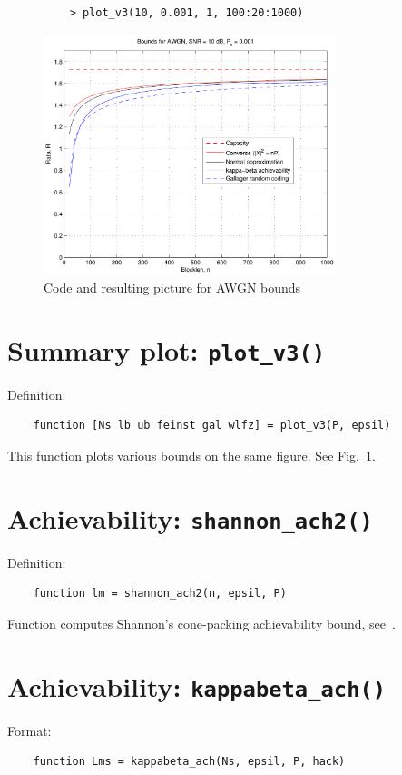 \documentclass[a4paper,11p]{memoir}
\begin{document}
\begin{figure}
\centering
\begin{verbatim}
	> plot_v3(10, 0.001, 1, 100:20:1000)
\end{verbatim}
\includegraphics[height=7cm]{plots/awgn_plot3_ex}
\caption{Code and resulting picture for AWGN bounds}\label{fig:awgn_example}
\end{figure}


\section{Summary plot: \texttt{plot\_v3()}}

Definition:
\begin{verbatim}
	function [Ns lb ub feinst gal wlfz] = plot_v3(P, epsil)
\end{verbatim}

This function plots various bounds on the same figure. See Fig.~\ref{fig:awgn_example}.


\section{Achievability: \texttt{shannon\_ach2()}}

Definition:
\begin{verbatim}
	function lm = shannon_ach2(n, epsil, P)
\end{verbatim}

Function computes Shannon's cone-packing achievability bound, see~\cite[(41)]{PPV08}.

\section{Achievability: \texttt{kappabeta\_ach()}}
Format:
\begin{verbatim}
	function Lms = kappabeta_ach(Ns, epsil, P, hack)
\end{verbatim}
\end{document}
